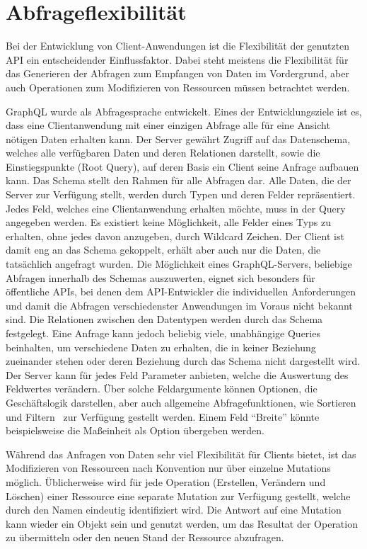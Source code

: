 \section{Abfrageflexibilität}
Bei der Entwicklung von Client-Anwendungen ist die Flexibilität der genutzten API ein entscheidender Einflussfaktor.
Dabei steht meistens die Flexibilität für das Generieren der Abfragen zum Empfangen von Daten im Vordergrund, aber auch Operationen zum Modifizieren von Ressourcen müssen betrachtet werden.
\par
GraphQL wurde als Abfragesprache entwickelt.
Eines der Entwicklungsziele ist es, dass eine Clientanwendung mit einer einzigen Abfrage alle für eine Ansicht nötigen Daten erhalten kann.
Der Server gewährt Zugriff auf das Datenschema, welches alle verfügbaren Daten und deren Relationen darstellt, sowie die Einstiegspunkte (Root Query), auf deren Basis ein Client seine Anfrage aufbauen kann.
Das Schema stellt den Rahmen für alle Abfragen dar.
Alle Daten, die der Server zur Verfügung stellt, werden durch Typen und deren Felder repräsentiert.
Jedes Feld, welches eine Clientanwendung erhalten möchte, muss in der Query angegeben werden.
Es existiert keine Möglichkeit, alle Felder eines Typs zu erhalten, ohne jedes davon anzugeben, \zB{} durch Wildcard Zeichen.
Der Client ist damit eng an das Schema gekoppelt, erhält aber auch nur die Daten, die tatsächlich angefragt wurden.
Die Möglichkeit eines GraphQL-Servers, beliebige Abfragen innerhalb des Schemas auszuwerten, eignet sich besonders für öffentliche APIs, bei denen dem API-Entwickler die individuellen Anforderungen und damit die Abfragen verschiedenster Anwendungen im Voraus nicht bekannt sind.
Die Relationen zwischen den Datentypen werden durch das Schema festgelegt.
Eine Anfrage kann jedoch beliebig viele, unabhängige Queries beinhalten, \zB{} um verschiedene Daten zu erhalten, die in keiner Beziehung zueinander stehen oder deren Beziehung durch das Schema nicht dargestellt wird.
Der Server kann für jedes Feld Parameter anbieten, welche die Auswertung des Feldwertes verändern.
Über solche Feldargumente können Optionen, die Geschäftslogik darstellen, aber auch allgemeine Abfragefunktionen, wie \zB{} Sortieren~\cite[vgl.][]{GraphQL-OrderBy} und Filtern~\cite[vgl.][]{GraphQL-Filter} zur Verfügung gestellt werden.
Einem Feld \enquote{Breite} könnte beispielsweise die Maßeinheit als Option übergeben werden.
\par
Während das Anfragen von Daten sehr viel Flexibilität für Clients bietet, ist das Modifizieren von Ressourcen nach Konvention nur über einzelne Mutations möglich.
Üblicherweise wird für jede Operation (Erstellen, Verändern und Löschen) einer Ressource eine separate Mutation zur Verfügung gestellt, welche durch den Namen eindeutig identifiziert wird.
Die Antwort auf eine Mutation kann wieder ein Objekt sein und genutzt werden, um das Resultat der Operation zu übermitteln oder den neuen Stand der Ressource abzufragen.
\par

